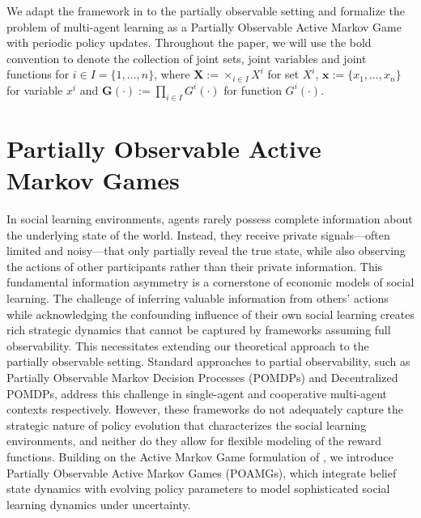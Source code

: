 \documentclass[a4paper,12pt]{report}
\begin{document}
We adapt the framework in \citet{kim2022influencing} to the partially observable setting and formalize the problem of multi-agent learning as a Partially Observable Active Markov Game with periodic policy updates. Throughout the paper, we will use the bold convention to denote the collection of joint sets, joint variables and joint functions for $i \in I =\{1,\ldots,n\}$, where $\boldsymbol{X} := \times_{i \in I} X^i$ for set $X^i$, $\boldsymbol{x} := \{x_1, \ldots, x_n\}$ for variable $x^i$ and $\boldsymbol{G}(\cdot) := \prod_{i \in I} G^i(\cdot)$ for function $G^i(\cdot)$.

\section{Partially Observable Active Markov Games}
In social learning environments, agents rarely possess complete information about the underlying state of the world. Instead, they receive private signals—often limited and noisy—that only partially reveal the true state, while also observing the actions of other participants rather than their private information. This fundamental information asymmetry is a cornerstone of economic models of social learning. The challenge of inferring valuable information from others' actions while acknowledging the confounding influence of their own social learning creates rich strategic dynamics that cannot be captured by frameworks assuming full observability. This necessitates extending our theoretical approach to the partially observable setting. Standard approaches to partial observability, such as Partially Observable Markov Decision Processes (POMDPs) and Decentralized POMDPs, address this challenge in single-agent and cooperative multi-agent contexts respectively. However, these frameworks do not adequately capture the strategic nature of policy evolution that characterizes the social learning environments, and neither do they allow for flexible modeling of the reward functions. Building on the Active Markov Game formulation of \citet{kim2022influencing}, we introduce Partially Observable Active Markov Games (POAMGs), which integrate belief state dynamics with evolving policy parameters to model sophisticated social learning dynamics under uncertainty.
\end{document}
